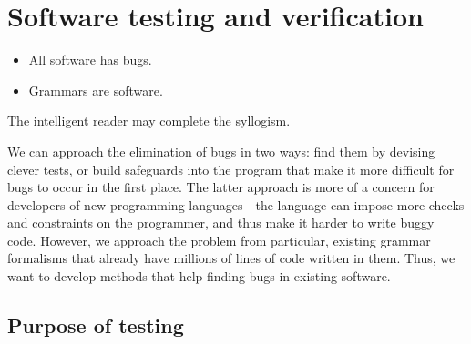 \section{Software testing and verification}
\label{sec:testing-intro} 

\begin{itemize}
\item All software has bugs.
\item Grammars are software.
\end{itemize}

The intelligent reader may complete the syllogism.

We can approach the elimination of bugs in two ways: find them
by devising clever tests, or build safeguards into the program that
make it more difficult for bugs to occur in the first place. The
latter approach is more of a concern for developers of new programming
languages---the language can impose more checks and constraints on the
programmer, and thus make it harder to write buggy code. However, we
approach the problem from particular, existing grammar formalisms that
already have millions of lines of code written in them. Thus, we want
to develop methods that help finding bugs in existing software.



\subsection{Purpose of testing}

